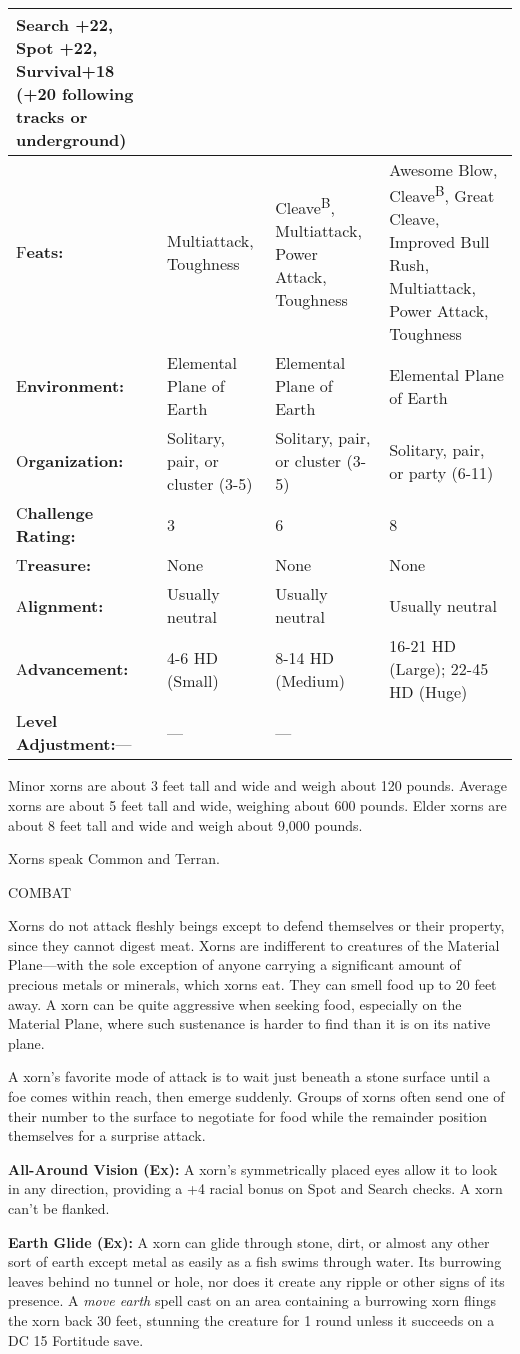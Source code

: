 \documentclass{article}
\begin{document}
\begin{tabular}{|>{\raggedright}p{42pt}|>{\raggedright}p{86pt}|>{\raggedright}p{86pt}|>{\raggedright}p{86pt}|}
Search +22, Spot +22, Survival+18 (+20 following tracks or underground)\tabularnewline
\hline
F\textbf{eats:} & Multiattack, Toughness & Cleave\textsuperscript{B}, Multiattack, 
Power Attack, Toughness & Awesome Blow, Cleave\textsuperscript{B}, Great Cleave, 
Improved Bull Rush, Multiattack, Power Attack, Toughness\tabularnewline
\hline
E\textbf{nvironment:} & Elemental Plane of Earth & Elemental Plane of Earth & Elemental 
Plane of Earth\tabularnewline
\hline
O\textbf{rganization:} & Solitary, pair, or cluster (3-5) & Solitary, pair, or 
cluster (3-5) & Solitary, pair, or party (6-11)\tabularnewline
\hline
C\textbf{hallenge Rating:} & 3 & 6 & 8\tabularnewline
\hline
T\textbf{reasure:} & None & None & None\tabularnewline
\hline
A\textbf{lignment:} & Usually neutral & Usually neutral & Usually neutral\tabularnewline
\hline
A\textbf{dvancement:} & 4-6 HD (Small) & 8-14 HD (Medium) & 16-21 HD (Large); 22-45 
HD (Huge)\tabularnewline
\hline
L\textbf{evel Adjustment:}--- & --- & --- & \tabularnewline
\hline
\end{tabular}

Minor xorns are about 3 feet tall and wide and weigh about 120 pounds. Average 
xorns are about 5 feet tall and wide, weighing about 600 pounds. Elder xorns are 
about 8 feet tall and wide and weigh about 9,000 pounds.

Xorns speak Common and Terran.

COMBAT

Xorns do not attack fleshly beings except to defend themselves or their property, 
since they cannot digest meat. Xorns are indifferent to creatures of the Material 
Plane---with the sole exception of anyone carrying a significant amount of precious 
metals or minerals, which xorns eat. They can smell food up to 20 feet away. A 
xorn can be quite aggressive when seeking food, especially on the Material Plane, 
where such sustenance is harder to find than it is on its native plane.

A xorn's favorite mode of attack is to wait just beneath a stone surface until 
a foe comes within reach, then emerge suddenly. Groups of xorns often send one 
of their number to the surface to negotiate for food while the remainder position 
themselves for a surprise attack.

\textbf{All-Around Vision (Ex): }A xorn's symmetrically placed eyes allow it to 
look in any direction, providing a +4 racial bonus on Spot and Search checks. A 
xorn can't be flanked. 

\textbf{Earth Glide (Ex):} A xorn can glide through stone, dirt, or almost any 
other sort of earth except metal as easily as a fish swims through water. Its burrowing 
leaves behind no tunnel or hole, nor does it create any ripple or other signs of 
its presence. A \textit{move earth }spell cast on an area containing a burrowing 
xorn flings the xorn back 30 feet, stunning the creature for 1 round unless it 
succeeds on a DC 15 Fortitude save.
\end{document}
